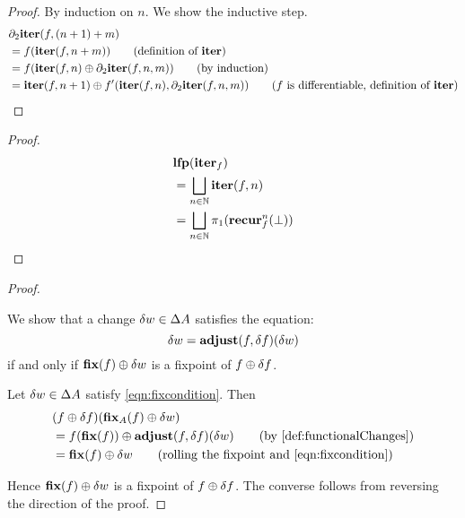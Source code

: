 \iterDerivativesN*
\begin{proof}
  \label{prf:iterDerivativesN}
  By induction on $n$. We show the inductive step.
  \begin{align*}
    &\partial_2\iter(f, (n+1) + m)\\
    &=f(\iter(f, n + m)) \tag{definition of $\iter$}\\
    &=f(\iter(f, n) \cplus \partial_2{\iter}(f, n, m)) \tag{by induction}\\
    &=\iter(f, n+1) \cplus \derive{f}(\iter(f, n), \partial_2{\iter}(f, n, m)) \tag{$f$ is differentiable, definition of $\iter$}
  \end{align*}
\end{proof}

\fixpointIter*
\begin{proof}
  \label{prf:fixpointIter}
  \begin{align*}
    &\mathbf{lfp}(\mathbf{iter}_f)\\
    &=\bigsqcup_{n \in \mathbb{N}} \mathbf{iter}(f, n)\\
    &=\bigsqcup_{n \in \mathbb{N}} \pi_1 (\mathbf{recur}_f^n(\bot))
  \end{align*}
\end{proof}

\fixpointPseudoDerivatives*
\begin{proof}
  \label{prf:fixpointPseudoDerivatives}
  
  We show that a change $\delta w \in \Delta A$ satisfies
  the equation:
  \begin{equation}\label{eqn:fixcondition}
    \delta w = \mathbf{adjust}(f, \delta f)(\delta w)
  \end{equation}
  if and only if $\mathbf{fix}(f) \oplus \delta w$ is a fixpoint of $f \oplus \delta f$.

  Let $\delta w \in \Delta A$ satisfy \cref{eqn:fixcondition}. Then
  \begin{align*}
    &(f \cplus \change{f})(\fixpoint_A(f) \cplus \change{w})\\
    &= f(\fixpoint(f))
    \cplus
    \adjust(f, \change{f})(\change{w})
    \tag{by \cref{def:functionalChanges}}\\
    &= \fixpoint(f)
    \cplus
    \change{w}
    \tag{rolling the fixpoint and \cref{eqn:fixcondition}}
  \end{align*}

  Hence $\mathbf{fix}(f) \oplus \delta w$ is a fixpoint of $f \oplus \delta f$. The converse
  follows from reversing the direction of the proof.
\end{proof}

